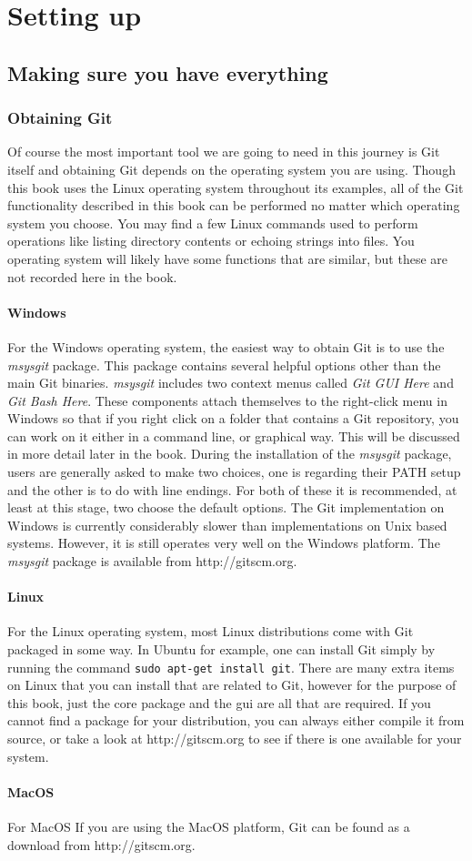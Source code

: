 \cleardoublepage
\chapter{Setting up}
\section{Making sure you have everything}
\subsection{Obtaining Git}
Of course the most important tool we are going to need in this journey is Git itself and obtaining Git depends on the operating system you are using.
Though this book uses the Linux operating system throughout its examples,
all of the Git functionality described in this book can be performed no matter which operating system you choose.
You may find a few Linux commands used to perform operations like listing directory contents or echoing strings into files.
You operating system will likely have some functions that are similar, but these are not recorded here in the book.

\subsubsection{Windows}
For the Windows operating system, the easiest way to obtain Git is to use the \emph{msysgit} package.
This package contains several helpful options other than the main Git binaries.
\emph{msysgit} includes two context menus called \emph{Git GUI Here} and \emph{Git Bash Here}.
These components attach themselves to the right-click menu in Windows so that if you right click on a folder that contains a Git repository,
you can work on it either in a command line, or graphical way.
This will be discussed in more detail later in the book.
During the installation of the \emph{msysgit} package, users are generally asked to make two choices, one is regarding their PATH setup and the other is to do with line endings.
For both of these it is recommended, at least at this stage, two choose the default options.
The Git implementation on Windows is currently considerably slower than implementations on Unix based systems.
However, it is still operates very well on the Windows platform.
The \emph{msysgit} package is available from http://gitscm.org.

\subsubsection{Linux}
For the Linux operating system, most Linux distributions come with Git packaged in some way.
In Ubuntu for example, one can install Git simply by running the command \texttt{sudo apt-get install git}.
There are many extra items on Linux that you can install that are related to Git, however for the purpose of this book, just the core package and the gui are all that are required.
If you cannot find a package for your distribution, you can always either compile it from source, or take a look at http://gitscm.org to see if there is one available for your system.

\subsubsection{MacOS}
For MacOS
If you are using the MacOS platform, Git can be found as a download from http://gitscm.org.

